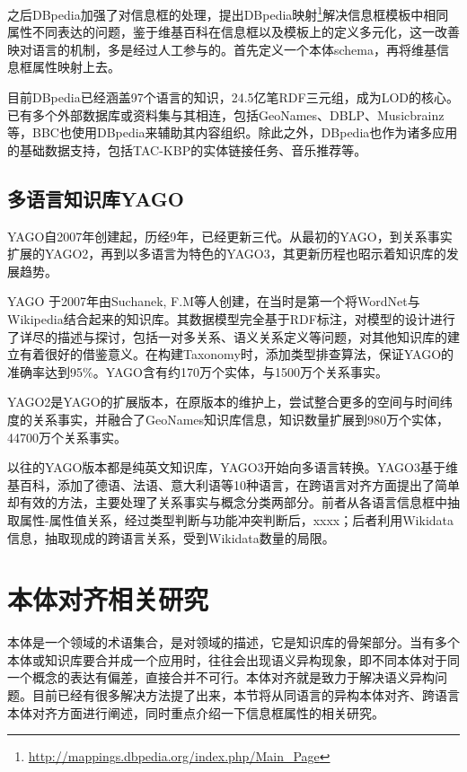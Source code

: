 之后DBpedia加强了对信息框的处理，提出DBpedia映射\footnote{\url{http://mappings.dbpedia.org/index.php/Main_Page}}解决信息框模板中相同属性不同表达的问题，鉴于维基百科在信息框以及模板上的定义多元化，这一改善映对语言的机制，多是经过人工参与的。首先定义一个本体schema，再将维基信息框属性映射上去\cite{mendes2012dbpedia}。

目前DBpedia已经涵盖97个语言的知识，24.5亿笔RDF三元组，成为LOD的核心。已有多个外部数据库或资料集与其相连，包括GeoNames、DBLP、Musicbrainz等，BBC也使用DBpedia来辅助其内容组织。除此之外，DBpedia也作为诸多应用的基础数据支持，包括TAC-KBP\cite{mendes2011evaluating}的实体链接任务、音乐推荐\cite{passant2010dbrec}等。

\subsection{多语言知识库YAGO}
YAGO自2007年创建起，历经9年，已经更新三代。从最初的YAGO\cite{suchanek2007yago,suchanek2008yago}，到关系事实扩展的YAGO2\cite{hoffart2013yago2}，再到以多语言为特色的YAGO3\cite{mahdisoltani2014yago3}，其更新历程也昭示着知识库的发展趋势。

{\heiti YAGO} 于2007年由Suchanek, F.M等人创建，在当时是第一个将WordNet\cite{fellbaum1998wordnet}与Wikipedia结合起来的知识库。其数据模型完全基于RDF标注，对模型的设计进行了详尽的描述与探讨，包括一对多关系、语义关系定义等问题，对其他知识库的建立有着很好的借鉴意义。在构建Taxonomy时，添加类型排查算法，保证YAGO的准确率达到95\%。YAGO含有约170万个实体，与1500万个关系事实。

{\heiti YAGO2}是YAGO的扩展版本，在原版本的维护上，尝试整合更多的空间与时间纬度的关系事实，并融合了GeoNames知识库信息，知识数量扩展到980万个实体，44700万个关系事实。

以往的YAGO版本都是纯英文知识库，{\heiti YAGO3}开始向多语言转换。YAGO3基于维基百科，添加了德语、法语、意大利语等10种语言，在跨语言对齐方面提出了简单却有效的方法，主要处理了关系事实与概念分类两部分。前者从各语言信息框中抽取属性-属性值关系，经过类型判断与功能冲突判断后，xxxx；后者利用Wikidata信息，抽取现成的跨语言关系，受到Wikidata数量的局限。

\section{本体对齐相关研究}

本体是一个领域的术语集合，是对领域的描述，它是知识库的骨架部分。当有多个本体或知识库要合并成一个应用时，往往会出现{\heiti 语义异构}现象，即不同本体对于同一个概念的表达有偏差，直接合并不可行。本体对齐就是致力于解决语义异构问题。目前已经有很多解决方法提了出来，本节将从同语言的异构本体对齐、跨语言本体对齐方面进行阐述，同时重点介绍一下信息框属性的相关研究。

